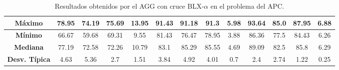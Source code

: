 \documentclass[11pt,a4paper]{article}
\begin{document}
\begin{table}[H]
{\begin{tabular}{c|c|c|c|c|c|c|c|c|c|c|c|c|}
\multicolumn{1}{|c|}{\textbf{Máximo}}       & 78.95             & 74.19                   & 75.69         & 13.95      & 91.43             & 91.18          & 91.3          & 5.98       & 93.64             & 85.0           & 87.95         & 6.88       \\ \hline
\multicolumn{1}{|c|}{\textbf{Mínimo}}       & 66.67             & 59.68                   & 69.31         & 9.55       & 81.43             & 76.47          & 78.95         & 3.88       & 86.36             & 77.5           & 84.43         & 6.26       \\ \hline
\multicolumn{1}{|c|}{\textbf{Mediana}}      & 77.19             & 72.58                   & 72.26         & 10.79      & 83.1              & 85.29          & 85.55         & 4.69       & 89.09             & 82.5           & 85.8          & 6.29       \\ \hline
\multicolumn{1}{|c|}{\textbf{Desv. Típica}} & 4.63              & 5.36                    & 2.7           & 1.51       & 3.84              & 4.92           & 4.01          & 0.7        & 2.4               & 2.74           & 1.22          & 0.25       \\ \hline
\end{tabular}
}%
\caption{Resultados obtenidos por el AGG con cruce BLX-$\alpha$ en el problema del APC.}
\end{table}
\end{document}
